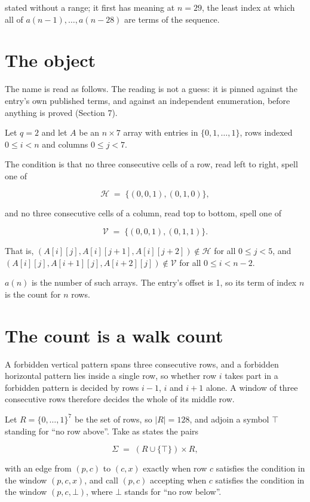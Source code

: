 \documentclass[11pt]{article}
\theoremstyle{definition}
\begin{document}
stated without a range; it first has meaning at $n = 29$, the least index at which all of $a(n-1),\dots,a(n-28)$ are terms of the sequence.

\section{The object}

The name is read as follows. The reading is not a guess: it is pinned against the entry's own published terms, and against an independent enumeration, before anything is proved (Section 7).

Let $q = 2$ and let $A$ be an $n \times 7$ array with entries in $\{0,1,\dots,1\}$, rows indexed $0 \le i < n$ and columns $0 \le j < 7$.

The condition is that no three consecutive cells of a row, read left to right, spell one of

\[\mathcal{H} \;=\; \{(0,0,1), (0,1,0)\},\]

and no three consecutive cells of a column, read top to bottom, spell one of

\[\mathcal{V} \;=\; \{(0,0,1), (0,1,1)\}.\]

That is, $(A[i][j],A[i][j{+}1],A[i][j{+}2]) \notin \mathcal{H}$ for all $0 \le j < 5$, and $(A[i][j],A[i{+}1][j],A[i{+}2][j]) \notin \mathcal{V}$ for all $0 \le i < n-2$.

$a(n)$ is the number of such arrays. The entry's offset is 1, so its term of index $n$ is the count for $n$ rows.

\section{The count is a walk count}

A forbidden vertical pattern spans three consecutive rows, and a forbidden horizontal pattern lies inside a single row, so whether row $i$ takes part in a forbidden pattern is decided by rows $i-1$, $i$ and $i+1$ alone. A window of three consecutive rows therefore decides the whole of its middle row.

Let $R = \{0,\dots,1\}^{7}$ be the set of rows, so $|R| = 128$, and adjoin a symbol $\top$ standing for ``no row above''. Take as states the pairs

\[\Sigma \;=\; (R \cup \{\top\}) \times R,\]

with an edge from $(p,c)$ to $(c,x)$ exactly when row $c$ satisfies the condition in the window $(p,c,x)$, and call $(p,c)$ accepting when $c$ satisfies the condition in the window $(p,c,\bot)$, where $\bot$ stands for ``no row below''.
\end{document}

